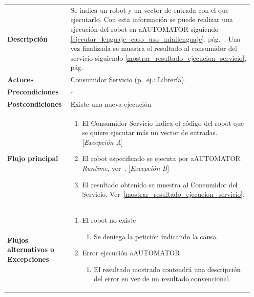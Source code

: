 \begin{tabular}[h]{ p{ } p{ }}

\textbf{Descripción} & Se indica un robot y un vector de entrada con
el que ejecutarlo. Con esta información se puede realizar una
ejecución del robot en aAUTOMATOR siguiendo
\ref{ejecutar_lenguaje_caso_uso_minilenguaje},
pág.~\pageref{ejecutar_lenguaje_caso_uso_minilenguaje}. Una vez
  finalizada se muestra el resultado al consumidor del servicio
  siguiendo \ref{mostrar_resultado_ejecucion_servicio},
  pág.~\pageref{mostrar_resultado_ejecucion_servicio}\\[3mm]

\textbf{Actores} & Consumidor Servicio (p.~ej.: Librería).\\[3mm]

\textbf{Precondiciones} & - \\[3mm]

\textbf{Postcondiciones} & Existe una nueva ejecución \\[3mm]

\textbf{Flujo principal} & \begin{enumerate}[leftmargin=1em,topsep=0pt, partopsep=0pt]
  \item El Consumidor Servicio indica el código del robot que se
    quiere ejecutar más un vector de entradas. [\emph{Excepción A}]
  \item El robot especificado se ejecuta por aAUTOMATOR
    \emph{Runtime},
    ver~\pageref{ejecutar_lenguaje_caso_uso_minilenguaje}.
    [\emph{Excepción B}]
  \item El resultado obtenido se muestra al Consumidor del
    Servicio. Ver~\ref{mostrar_resultado_ejecucion_servicio}.
\end{enumerate}\\[3mm]

\textbf{Flujos alternativos o Excepciones} &
\begin{enumerate}[label=\Alph*:,leftmargin=1em,topsep=0pt,
    partopsep=0pt]
\item El robot no existe
  \begin{enumerate}[label=\arabic*.,topsep=0pt, partopsep=0pt]
    \item Se deniega la petición indicando la causa.
  \end{enumerate}
\item Error ejecución aAUTOMATOR
  \begin{enumerate}[label=\arabic*.,topsep=0pt, partopsep=0pt]
     \item El resultado mostrado contendrá una descripción del error
       en vez de un resultado convencional.
  \end{enumerate}
\end{enumerate}\\[3mm]
\end{tabular}

